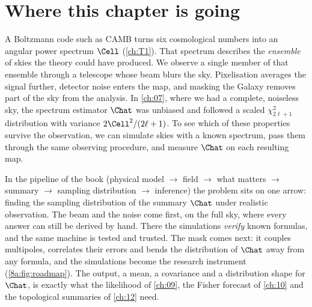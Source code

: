 \providecommand{\EightAPivKdec}{}\renewcommand{\EightAPivKdec}{0.083}
\providecommand{\EightAPivKdecFromTwo}{}\renewcommand{\EightAPivKdecFromTwo}{0.083}
\providecommand{\EightAPivLdec}{}\renewcommand{\EightAPivLdec}{1155}
\providecommand{\EightAPivKdecMarg}{}\renewcommand{\EightAPivKdecMarg}{0.091}
\providecommand{\EightAPivRhoFiveMarg}{}\renewcommand{\EightAPivRhoFiveMarg}{-0.21}
\providecommand{\EightAPivRhoTwoMarg}{}\renewcommand{\EightAPivRhoTwoMarg}{-0.81}
\providecommand{\EightAPivKdecCV}{}\renewcommand{\EightAPivKdecCV}{0.030}
\providecommand{\EightAPivLdecCV}{}\renewcommand{\EightAPivLdecCV}{416}
\providecommand{\EightAPivRhoTwoCV}{}\renewcommand{\EightAPivRhoTwoCV}{-0.98}
\providecommand{\EightAPivLdecApprox}{}\renewcommand{\EightAPivLdecApprox}{972}
\providecommand{\EightAPivDstar}{}\renewcommand{\EightAPivDstar}{13.87}
\providecommand{\EightAPivLfive}{}\renewcommand{\EightAPivLfive}{694}
\providecommand{\EightAPivLtwo}{}\renewcommand{\EightAPivLtwo}{28}
\providecommand{\EightAPivSigNsFive}{}\renewcommand{\EightAPivSigNsFive}{0.0025}
\providecommand{\EightAPivSigAFive}{}\renewcommand{\EightAPivSigAFive}{0.0017}
\providecommand{\EightAPivSigATwo}{}\renewcommand{\EightAPivSigATwo}{0.0094}
\section*{Where this chapter is going}
\label{8a:sec:roadmap}

A Boltzmann code such as CAMB turns six cosmological numbers into an angular power
spectrum $\Cell$ (\cref{ch:T1}). That spectrum describes the \emph{ensemble} of skies the
theory could have produced. We observe a single member of that ensemble through a telescope whose beam
blurs the sky. Pixelisation averages the signal further, detector noise enters
the map, and masking the Galaxy removes part of the sky from the analysis.
In \cref{ch:07}, where we had a complete, noiseless sky, the spectrum estimator
$\Chat$ was unbiased and followed a scaled $\chi^2_{2\ell+1}$ distribution with
variance $2\Cell^2/(2\ell+1)$. To see which of these properties survive the
observation, we can simulate skies with a known spectrum, pass them through
the same observing procedure, and measure $\Chat$ on each resulting map.

In the pipeline of the book (physical model $\to$ field $\to$ what matters $\to$ summary
$\to$ sampling distribution $\to$ inference) the problem sits on one arrow: finding the
sampling distribution of the summary $\Chat$ under realistic observation. The beam and the
noise come first, on the full sky, where every answer can still be derived by hand. There
the simulations \emph{verify} known formulas, and the same machine is tested and trusted.
The mask comes next: it couples multipoles, correlates their errors and bends the
distribution of $\Chat$ away from any formula, and the simulations become the research
instrument (\cref{8a:fig:roadmap}). The output, a mean, a covariance and a distribution
shape for $\Chat$, is exactly what the likelihood of \cref{ch:09}, the Fisher forecast of
\cref{ch:10} and the topological summaries of \cref{ch:12} need.

